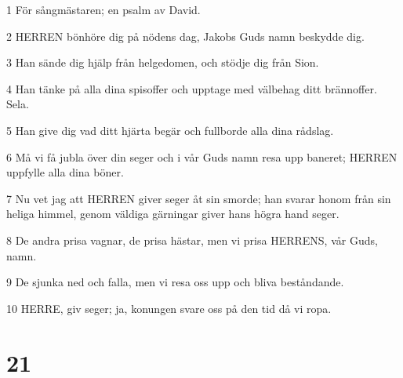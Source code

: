 \par 1 För sångmästaren; en psalm av David.
\par 2 HERREN bönhöre dig på nödens dag, Jakobs Guds namn beskydde dig.
\par 3 Han sände dig hjälp från helgedomen, och stödje dig från Sion.
\par 4 Han tänke på alla dina spisoffer och upptage med välbehag ditt brännoffer. Sela.
\par 5 Han give dig vad ditt hjärta begär och fullborde alla dina rådslag.
\par 6 Må vi få jubla över din seger och i vår Guds namn resa upp baneret; HERREN uppfylle alla dina böner.
\par 7 Nu vet jag att HERREN giver seger åt sin smorde; han svarar honom från sin heliga himmel, genom väldiga gärningar giver hans högra hand seger.
\par 8 De andra prisa vagnar, de prisa hästar, men vi prisa HERRENS, vår Guds, namn.
\par 9 De sjunka ned och falla, men vi resa oss upp och bliva beståndande.
\par 10 HERRE, giv seger; ja, konungen svare oss på den tid då vi ropa.

\chapter{21}

